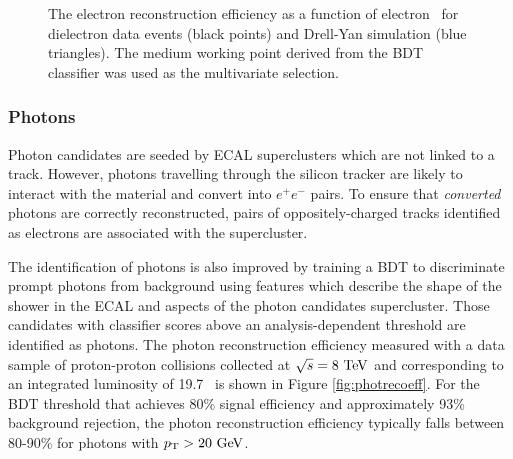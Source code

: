 \begin{figure}[htbp]
{  }
  \caption[Electron Reconstruction Efficiency]{The electron reconstruction efficiency as a function of electron \pT\ for dielectron data events (black points) and Drell-Yan simulation (blue triangles). The medium working point derived from the BDT classifier was used as the multivariate selection.\cite{CMSELEPERF}}
    \label{fig:elerecoeff}
\end{figure}

\subsubsection{Photons}

Photon candidates are seeded by ECAL superclusters which are not linked to a track. However, photons travelling through the silicon tracker are likely to interact with the material and convert into $e^{+}e^{-}$ pairs. To ensure that \textit{converted} photons are correctly reconstructed, pairs of oppositely-charged tracks identified as electrons are associated with the supercluster.

The identification of photons is also improved by training a BDT to discriminate prompt photons from background using features which describe the shape of the shower in the ECAL and aspects of the photon candidates supercluster.\cite{CMSPHOTPERF} Those candidates with classifier scores above an analysis-dependent threshold are identified as photons. The photon reconstruction efficiency measured with a data sample of proton-proton collisions collected at $\sqrt{s} = 8\ \mathrm{TeV}$ and corresponding to an integrated luminosity of 19.7 \invfb\ is shown in Figure \ref{fig:photrecoeff}. For the BDT threshold that achieves 80\% signal efficiency and approximately 93\% background rejection, the photon reconstruction efficiency typically falls between 80-90\% for photons with $p_{\mathrm{T}} > 20\ \mathrm{GeV}$.

